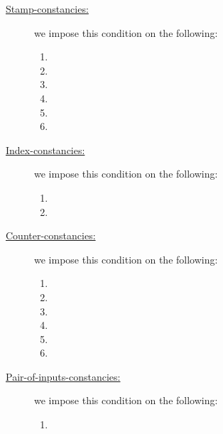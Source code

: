 \begin{description}
    \item[\underline{Stamp-constancies:}]
        we impose this condition on the following:
        \begin{multicols}{3}
            \begin{enumerate}
                \item \blsId{}
                \item \blsSuccessBit{}
                \item \malformedDataInternalTot{}
                \item \malformedDataExternalTot{}
                \item \wellformedDataTrivial{}
                \item \wellformedDataNontrivial{}
            \end{enumerate}
        \end{multicols}
    \item[\underline{Index-constancies:}]
        we impose this condition on the following:
        \begin{multicols}{1}
            \begin{enumerate}
                \item \blsPhase{}
                \item \indexMax{}
            \end{enumerate}
        \end{multicols}
    \item[\underline{Counter-constancies:}]
        we impose this condition on the following:
        \begin{multicols}{3}
            \begin{enumerate}
                \item \maxCt{}
                \item \isInfinity{}
                \item \accInputs{}
                \item \nontrivialPairOfPointsAcc{}
                \item \malformedDataExternalBit{}
                \item \malformedDataExternalAcc{}
            \end{enumerate}
        \end{multicols}
    \item[\underline{Pair-of-inputs-constancies:}]
        we impose this condition on the following:
        \begin{multicols}{3}
            \begin{enumerate}
                \item \nontrivialPairOfPointsBit{}
            \end{enumerate}
        \end{multicols}
\end{description}
